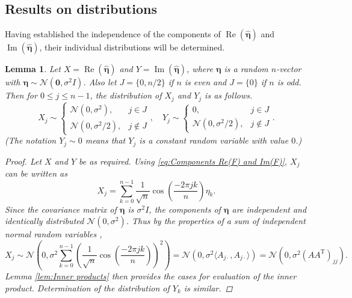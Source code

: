 \documentclass[12pt]{article}
\newcommand{\trans}{\mathrm{T}}	%
\newcommand{\noise}{\eta}	%
\newcommand{\noiseSD}{\sigma}	%
\newcommand{\noiseVec}{\bm{\noise}}	%
\renewcommand{\Re}{\operatorname{Re}}	%
\renewcommand{\Im}{\operatorname{Im}}	%
\newtheorem{lemma}{Lemma}[section]
\begin{document}
\subsection{Results on distributions} \label{sec:Results on distributions}

Having established the independence of the components of $\Re(\widehat{\noiseVec})$ and $\Im(\widehat{\noiseVec})$, their individual distributions will be determined. 

\begin{lemma}
\label{lem:Component distributions}
Let $X = \Re(\widehat{\noiseVec})$ and $Y = \Im(\widehat{\noiseVec})$, where $\noiseVec$ is a random $n$-vector with $\noiseVec \sim \mathcal{N}(\bm{0},\noiseSD^2 I)$. Also let $J = \{0,n/2\}$ if $n$ is even and $J = \{0\}$ if $n$ is odd. Then for $0 \leq j \leq n-1$, the distribution of $X_j$ and $Y_j$ is as follows.  
\[X_j \sim \begin{cases}
\mathcal{N}(0,\noiseSD^2), & j \in J \\
\mathcal{N}(0,\noiseSD^2/2), & j \not\in J \end{cases}, \quad Y_j \sim \begin{cases}
0, & j \in J \\
\mathcal{N}(0,\noiseSD^2/2), & j \not\in J
\end{cases}.\]
(The notation $Y_j \sim 0$ means that $Y_j$ is a constant random variable with value $0$.)
\begin{proof}
Let $X$ and $Y$ be as required. Using \eqref{eq:Components Re(F) and Im(F)}, $X_j$ can be written as
\[X_j = \sum_{k=0}^{n-1} \frac{1}{\sqrt{n}}\cos\left(\frac{-2\pi{jk}}{n}\right)\noise_k.\]
Since the covariance matrix of $\noiseVec$ is $\noiseSD^2 I$, the components of $\noiseVec$ are independent and identically distributed $\mathcal{N}(0,\noiseSD^2)$. Thus by the properties of a sum of independent normal random variables \cite[p.~184]{CasellaBerger02},
\[X_j \sim \mathcal{N}\left(0, \noiseSD^2\sum_{k=0}^{n-1} \left(\frac{1}{\sqrt{n}}\cos\left(\frac{-2\pi{jk}}{n}\right)\right)^2\right) = \mathcal{N}\left(0, \noiseSD^2 \langle A_{j\cdot},A_{j\cdot} \rangle\right) = \mathcal{N}\left(0, \noiseSD^2 (AA^\trans)_{jj}\right).\]
Lemma \ref{lem:Inner products} then provides the cases for evaluation of the inner product. Determination of the distribution of $Y_k$ is similar.
\end{proof}
\end{lemma}
\end{document}
